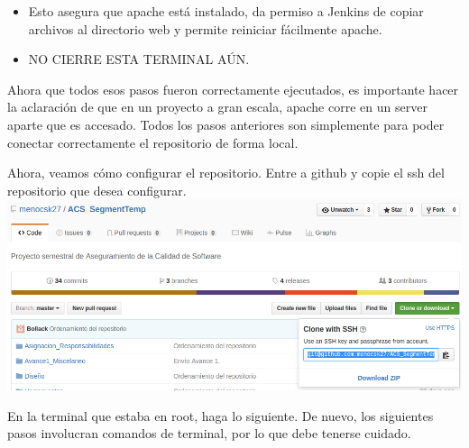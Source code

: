 \documentclass[a4paper]{article}
\begin{document}
{\begin{itemize}
	Salve el archivo con Ctrl + X, luego Y y por último Enter para confirmar. 
    \item Esto asegura que apache está instalado, da permiso a Jenkins de copiar archivos al directorio web y permite reiniciar fácilmente apache. 
    \item NO CIERRE ESTA TERMINAL AÚN. 
	\end{itemize}
    
    Ahora que todos esos pasos fueron correctamente ejecutados, es importante hacer la aclaración de que en un proyecto a gran escala, apache corre en un server aparte que es accesado. Todos los pasos anteriores son simplemente para poder conectar correctamente el repositorio de forma local. 
    
\newpage  
    Ahora, veamos cómo configurar el repositorio. Entre a github y copie el ssh del repositorio que desea configurar. \\
    
\centering
    \includegraphics[scale=0.4]{repossh}\\
\justify

    En la terminal que estaba en root, haga lo siguiente. De nuevo, los siguientes pasos involucran comandos de terminal, por lo que debe tenerse cuidado. \\
    
}
\end{document}
